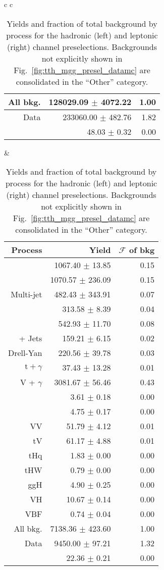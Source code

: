 \begin{table} [h!]
\begin{tabular}{c c}
\begin{tabular}{ r || r | r}
            All bkg. & 128029.09 $\pm$ 4072.22 & 1.00 \\ \hline 
            Data & 233060.00 $\pm$ 482.76 & 1.82 \\ \hline 
			\ttH & 48.03 $\pm$ 0.32 & 0.00 \\  \hline \hline
		\end{tabular}    
		&
		\begin{tabular}{ r || r | r} \hline \hline
			Process & Yield & $\mathcal F$ of bkg \\ \hline
            \dipho & 1067.40 $\pm$ 13.85 & 0.15 \\ 
			\gjets & 1070.57 $\pm$ 236.09 & 0.15 \\ 
			Multi-jet & 482.43 $\pm$ 343.91 & 0.07 \\ 
			\ttgg & 313.58 $\pm$ 8.39 & 0.04 \\ 
			\ttg & 542.93 $\pm$ 11.70 & 0.08 \\ 
			\ttb + Jets & 159.21 $\pm$ 6.15 & 0.02 \\ 
			Drell-Yan & 220.56 $\pm$ 39.78 & 0.03 \\ 
            $\text{t} + \gamma$ & 37.43 $\pm$ 13.28 & 0.01 \\ 
			V + $\gamma$ & 3081.67 $\pm$ 56.46 & 0.43 \\ 
			\ttW & 3.61 $\pm$ 0.18 & 0.00 \\ 
			\ttZ & 4.75 $\pm$ 0.17 & 0.00 \\ 
			VV & 51.79 $\pm$ 4.12 & 0.01 \\ 
			tV & 61.17 $\pm$ 4.88 & 0.01 \\  \hline
			tHq & 1.83 $\pm$ 0.00 & 0.00 \\ 
            tHW & 0.79 $\pm$ 0.00 & 0.00 \\ 
			ggH & 4.90 $\pm$ 0.25 & 0.00 \\ 
            VH & 10.67 $\pm$ 0.14 & 0.00 \\ 
            VBF & 0.74 $\pm$ 0.04 & 0.00 \\ \hline 
			All bkg. & 7138.36 $\pm$ 423.60 & 1.00 \\ \hline
			Data & 9450.00 $\pm$ 97.21 & 1.32 \\ \hline
			\ttH & 22.36 $\pm$ 0.21 & 0.00 \\  \hline \hline
		\end{tabular}
    \end{tabular}
    \caption{Yields and fraction of total background by process for the hadronic (left) and leptonic (right) channel preselections. Backgrounds not explicitly shown in Fig.~\ref{fig:tth_mgg_presel_datamc} are consolidated in the ``Other'' category.}
	\label{tab:tth_presel_datamc}
\end{table}

